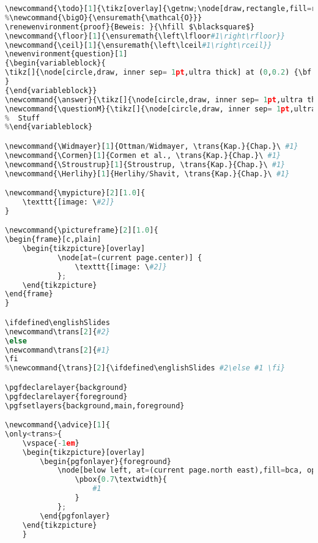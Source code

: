 {\begin{lstlisting}[language=Python,style=normal,escapechar=?,morekeywords={True, False}, mathescape]
\newcommand{\todo}[1]{\tikz[overlay]{\getnw;\node[draw,rectangle,fill=red,right] at (nw){\color{white}! #1 !};}}
%\newcommand{\bigO}{\ensuremath{\mathcal{O}}}
\renewenvironment{proof}{Beweis: }{\hfill $\blacksquare$}
\newcommand{\floor}[1]{\ensuremath{\left\lfloor#1\right\rfloor}}
\newcommand{\ceil}[1]{\ensuremath{\left\lceil#1\right\rceil}}
\newenvironment{question}[1]
{\begin{variableblock}{
\tikz[]{\node[circle,draw, inner sep= 1pt,ultra thick] at (0,0.2) {\bf ?};} #1}{bg=textbg,fg=textfg}{bg=bcb,fg=textfg}
}
{\end{variableblock}}
\newcommand{\answer}{\tikz[]{\node[circle,draw, inner sep= 1pt,ultra thick] at (0,0.2) {\bf !};}}
\newcommand{\questionM}{\tikz[]{\node[circle,draw, inner sep= 1pt,ultra thick] at (0,0.2) {\bf ?};}}
%  Stuff
%\end{variableblock}

\newcommand{\Widmayer}[1]{Ottman/Widmayer, \trans{Kap.}{Chap.}\ #1}
\newcommand{\Cormen}[1]{Cormen et al., \trans{Kap.}{Chap.}\ #1}
\newcommand{\Stroustrup}[1]{Stroustrup, \trans{Kap.}{Chap.}\ #1}
\newcommand{\Herlihy}[1]{Herlihy/Shavit, \trans{Kap.}{Chap.}\ #1}

\newcommand{\mypicture}[2][1.0]{
    \texttt{[image: \#2]}
}

\newcommand{\pictureframe}[2][1.0]{
\begin{frame}[c,plain]
    \begin{tikzpicture}[overlay]
            \node[at=(current page.center)] {
                \texttt{[image: \#2]}
            };
    \end{tikzpicture}
\end{frame}
}

\ifdefined\englishSlides
\newcommand\trans[2]{#2}
\else
\newcommand\trans[2]{#1}
\fi
%\newcommand{\trans}[2]{\ifdefined\englishSlides #2\else #1 \fi}

\pgfdeclarelayer{background}
\pgfdeclarelayer{foreground}
\pgfsetlayers{background,main,foreground}

\newcommand{\advice}[1]{
\only<trans>{
   	\vspace{-1em}
    \begin{tikzpicture}[overlay]
	    \begin{pgfonlayer}{foreground}
            \node[below left, at=(current page.north east),fill=bca, opacity=0.7] {\smaller
                \pbox{0.7\textwidth}{
                	#1
                }
            };
       	\end{pgfonlayer}
    \end{tikzpicture}
	}
	

\end{lstlisting}}
